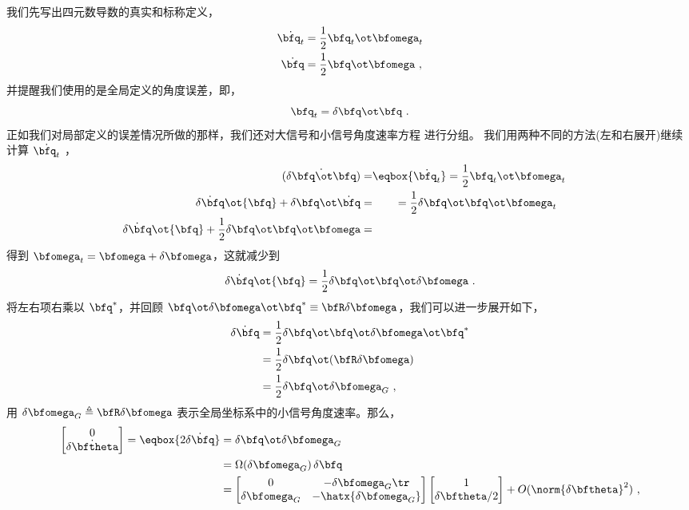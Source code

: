 我们先写出四元数导数的真实和标称定义，
%
%
\begin{align}
\dot{\bfq_t} &= \frac{1}{2}\bfq_t\ot\bfomega_t \\
\dot{\bfq} &= \frac{1}{2}\bfq\ot\bfomega~,
\end{align}%
%
并提醒我们使用的是全局定义的角度误差，即，
%
\begin{equation}
\bfq_t = \delta\bfq\ot\bfq~.
\end{equation}
%
正如我们对局部定义的误差情况所做的那样，我们还对大信号和小信号角度速率方程 进行分组。 
我们用两种不同的方法(左和右展开)继续计算 $\dot{\bfq_t}$ ，
%
%
\begin{align*}
\dot{{({\delta\bfq}\ot\bfq)}} =& \eqbox{\dot{\bfq_t}} = \frac{1}{2}\bfq_t\ot\bfomega_t \\
\dot{\delta\bfq}\ot{\bfq} + \delta\bfq\ot\dot{{\bfq}} =&~~~~~~= \frac{1}{2}\delta\bfq\ot\bfq\ot\bfomega_t \\
\dot{\delta\bfq}\ot{\bfq} + \frac{1}{2}\delta\bfq\ot\bfq\ot\bfomega =&&  
\end{align*}%
%
得到 $\bfomega_t = \bfomega + \delta\bfomega$，这就减少到
%
\begin{equation}
\dot{\delta\bfq}\ot{\bfq} = \frac{1}{2}\delta\bfq\ot\bfq\ot\delta\bfomega~.
\end{equation}
%
将左右项右乘以 $\bfq^*$，并回顾 $\bfq\ot\delta\bfomega\ot\bfq^* \equiv \bfR\delta\bfomega$，我们可以进一步展开如下，
%
%
\begin{align}
\dot{\delta\bfq} &= \frac{1}{2}\delta\bfq\ot\bfq\ot\delta\bfomega\ot\bfq^* \nonumber \\
&= \frac{1}{2}\delta\bfq\ot(\bfR\delta\bfomega) \nonumber \\
&= \frac{1}{2}\delta\bfq\ot\delta\bfomega_G~,
\end{align}%
%
用 $\delta\bfomega_G \triangleq \bfR\delta\bfomega$ 表示全局坐标系中的小信号角度速率。那么，
%
%
\begin{align}
\begin{bmatrix}
0\\\dot{\delta\bftheta}
\end{bmatrix} = \eqbox{2\dot{{\delta\bfq}}} 
&= {\delta\bfq}\ot\delta\bfomega_G \nonumber \\
&= \Omega(\delta\bfomega_G)\,\delta\bfq \nonumber \\
&= \begin{bmatrix}
0 & -\delta\bfomega_G\tr \\
\delta\bfomega_G & -\hatx{\delta\bfomega_G} 
\end{bmatrix}\begin{bmatrix}
1 \\
\delta\bftheta/2
\end{bmatrix} + O(\norm{\delta\bftheta}^2) ~,
\end{align}%
